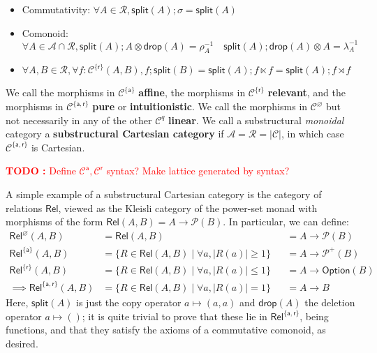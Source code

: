 \documentclass[acmsmall,screen,review]{acmart}
\newcounter{todos}
\newcommand{\TODO}[1]{{
  \stepcounter{todos}
  \begin{center}\large{\textcolor{red}{\textbf{TODO \arabic{todos}:} #1}}\end{center}
}}
\newcommand{\mc}[1]{\ensuremath{\mathcal{#1}}}
\newcommand{\ms}[1]{\ensuremath{\mathsf{#1}}}
\begin{document}
\begin{definition}
\begin{itemize}
\begin{itemize}
      \item Commutativity: \(\forall A \in \mc{R}, \ms{split}(A);\sigma = \ms{split}(A)\)
      \item Comonoid: \(\forall A \in \mc{A} \cap \mc{R}, \ms{split}(A);A \otimes \ms{drop}(A) = \rho_A^{-1} \quad \ms{split}(A);\ms{drop}(A) \otimes A = \lambda_A^{-1}\)
      \item \(\forall A, B \in \mc{R}, \forall f: \mc{C}^{\{\ms{r}\}}(A, B), f;\ms{split}(B) = \ms{split}(A);f \ltimes f = \ms{split}(A);f\rtimes f\)
    \end{itemize}
  \end{itemize}
  We call the morphisms in \(\mc{C}^{\{\ms{a}\}}\) \textbf{affine}, the morphisms in \(\mc{C}^{\{\ms{r}\}}\) \textbf{relevant}, and the morphisms in \(\mc{C}^{\{\ms{a}, \ms{r}\}}\) \textbf{pure} or \textbf{intuitionistic}. We call the morphisms in \(\mc{C}^\varnothing\) but not necessarily in any of the other \(\mc{C}^q\) \textbf{linear}. We call a substructural \textit{monoidal} category a \textbf{substructural Cartesian category} if \(\mc{A} = \mc{R} = |\mc{C}|\), in which case \(\mc{C}^{\{\ms{a}, \ms{r}\}}\) is Cartesian.
\end{definition}
\TODO{Define \(\mc{C}^{\ms{a}}, \mc{C}^{\ms{r}}\) syntax? Make lattice generated by syntax?}
A simple example of a substructural Cartesian category is the category of relations \(\ms{Rel}\), viewed as the Kleisli category of the power-set monad with morphisms of the form \(\ms{Rel}(A, B) = A \to \mc{P}(B)\). In particular, we can define:
\begin{equation}
  \begin{aligned}
    \ms{Rel}^\varnothing(A, B) 
    &= \ms{Rel}(A, B) 
    &&= A \to \mc{P}(B) \\
    \ms{Rel}^{\{\ms{a}\}}(A, B) 
    &= \{R \in \ms{Rel}(A, B) \mid \forall a, |R(a)| \geq 1\} 
    &&= A \to \mc{P}^+(B) \\
    \ms{Rel}^{\{\ms{r}\}}(A, B) 
    &= \{R \in \ms{Rel}(A, B) \mid \forall a, |R(a)| \leq 1\} 
    &&= A \to \ms{Option}(B) \\
    \implies \ms{Rel}^{\{\ms{a}, \ms{r}\}}(A, B) 
    &= \{R \in \ms{Rel}(A, B) \mid \forall a, |R(a)| = 1\} 
    &&= A \to B
  \end{aligned}
\end{equation}
Here, \(\ms{split}(A)\) is just the copy operator \(a \mapsto (a, a)\) and \(\ms{drop}(A)\) the deletion operator \(a \mapsto ()\); it is quite trivial to prove that these lie in \(\ms{Rel}^{\{\ms{a}, \ms{r}\}}\), being functions, and that they satisfy the axioms of a commutative comonoid, as desired. 
\end{document}
